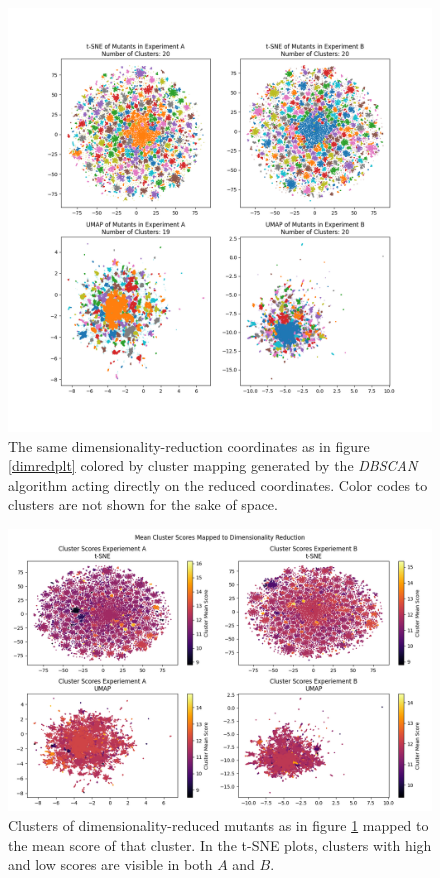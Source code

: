 \documentclass[16pt]{book}
\begin{document}
\begin{center}
\begin{figure}
	\includegraphics[width=\textwidth]{img/dimred-plt-clusters.png}
	\caption{\label{dimredclusters} The same dimensionality-reduction coordinates as in figure \ref{dimredplt} colored by cluster mapping generated by the \textit{DBSCAN} algorithm acting directly on the reduced coordinates. Color codes to clusters are not shown for the sake of space.}
\end{figure}

\begin{figure}
	\includegraphics[width=1.1\textwidth]{img/dimred-clust-meanscores.png}
	\caption{\label{dimredclustersscores} Clusters of dimensionality-reduced mutants as in figure \ref{dimredclusters} mapped to the mean score of that cluster.
	In the t-SNE plots, clusters with high and low scores are visible in both $A$ and $B$.}
\end{figure}
\end{center}
\end{document}

